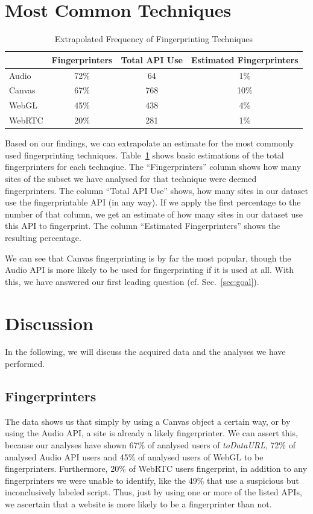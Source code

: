 \documentclass[
    fontsize=12pt,
    headings=small,
    parskip=half,
    bibliography=totoc,
    numbers=noenddot,
    open=any
    ]{scrreprt}
\begin{document}
\section{Most Common Techniques}
\begin{table}
\centering
\caption{Extrapolated Frequency of Fingerprinting Techniques}
\begin{tabular}{l c c c}
    \toprule
    & Fingerprinters & Total API Use & Estimated Fingerprinters \\
    \midrule
    Audio & 72\% & 64 & 1\% \\
    Canvas & 67\% & 768 & 10\% \\
    WebGL & 45\% & 438 & 4\% \\
    WebRTC & 20\% & 281 & 1\% \\
    \bottomrule
\end{tabular}
\label{table:technique_frequency}
\end{table}

Based on our findings, we can extrapolate an estimate for the most commonly used fingerprinting
techniques.
Table~\ref{table:technique_frequency} shows basic estimations of the total fingerprinters
for each technqiue. The ``Fingerprinters'' column shows how many sites of the subset
we have analysed for that technique were deemed fingerprinters. The column ``Total API Use''
shows, how many sites in our dataset use the fingerprintable API (in any way).
If we apply the first percentage to the number of that column, we get an estimate
of how many sites in our dataset use this API to fingerprint. The column ``Estimated Fingerprinters''
shows the resulting percentage.

We can see that Canvas fingerprinting is by far the most popular, though the Audio API is more
likely to be used for fingerprinting if it is used at all.
With this, we have answered our first leading question (cf. Sec.~\ref{sec:goal}).


\section{Discussion}
In the following, we will discuss the acquired data and the analyses we have performed.

\subsection{Fingerprinters}
The data shows us that simply by using a Canvas object a certain way, or by using the Audio API,
a site is already a likely fingerprinter. We can assert this, because our analyses have shown
67\% of analysed users of \textit{toDataURL}, 72\% of analysed Audio API users and 45\%
of analysed users of WebGL to be fingerprinters.
Furthermore, 20\% of WebRTC users fingerprint, in addition to any fingerprinters we were unable
to identify, like the 49\% that use a suspicious but inconclusively labeled script.
Thus, just by using one or more of the listed APIs, we ascertain that a website is more likely
to be a fingerprinter than not.
\end{document}
